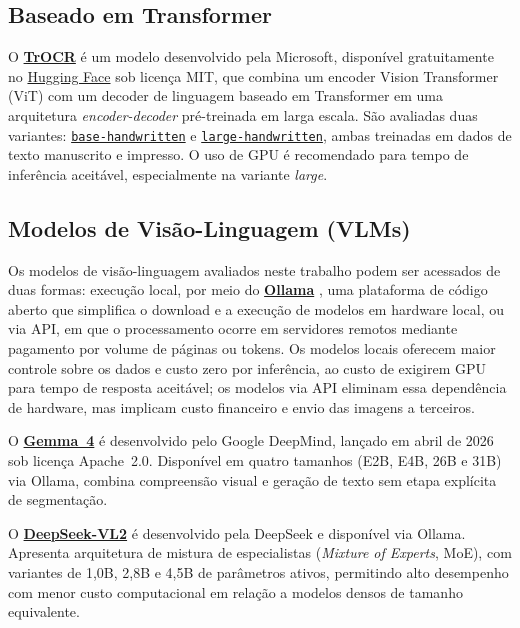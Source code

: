 \documentclass[
  12pt,
  oneside,
  a4paper,
  chapter=TITLE,
  section=TITLE,
  english,
  brazil
]{abntex2}
\begin{document}
\subsection{Baseado em Transformer}

O \href{https://huggingface.co/microsoft/trocr-base-handwritten}{\textbf{TrOCR}}
\cite{huang2021} é um modelo desenvolvido pela Microsoft, disponível gratuitamente no
\href{https://huggingface.co/microsoft/trocr-base-handwritten}{Hugging Face} sob licença
MIT, que combina um encoder Vision Transformer (ViT) com um decoder de linguagem baseado
em Transformer em uma arquitetura \textit{encoder-decoder} pré-treinada em larga escala.
São avaliadas duas variantes:
\href{https://huggingface.co/microsoft/trocr-base-handwritten}{\texttt{base-handwritten}}
e
\href{https://huggingface.co/microsoft/trocr-large-handwritten}{\texttt{large-handwritten}},
ambas treinadas em dados de texto manuscrito e impresso. O uso de GPU é recomendado para
tempo de inferência aceitável, especialmente na variante \textit{large}.

\subsection{Modelos de Visão-Linguagem (VLMs)}

Os modelos de visão-linguagem avaliados neste trabalho podem ser acessados de duas
formas: execução local, por meio do
\href{https://ollama.com}{\textbf{Ollama}} \cite{ollama2023}, uma plataforma de código
aberto que simplifica o download e a execução de modelos em hardware local, ou via
API, em que o processamento ocorre em servidores remotos mediante pagamento por volume
de páginas ou tokens. Os modelos locais oferecem maior controle sobre os dados e custo
zero por inferência, ao custo de exigirem GPU para tempo de resposta aceitável; os
modelos via API eliminam essa dependência de hardware, mas implicam custo financeiro e
envio das imagens a terceiros.

O \href{https://ai.google.dev/gemma/docs/core}{\textbf{Gemma~4}}
\cite{gemma4_modelcard} é desenvolvido pelo Google DeepMind, lançado em abril de 2026
sob licença Apache~2.0. Disponível em quatro tamanhos (E2B, E4B, 26B e 31B) via Ollama,
combina compreensão visual e geração de texto sem etapa explícita de segmentação.

O \href{https://github.com/deepseek-ai/DeepSeek-VL2}{\textbf{DeepSeek-VL2}}
\cite{wu2024deepseekvl2} é desenvolvido pela DeepSeek e disponível via Ollama. Apresenta
arquitetura de mistura de especialistas (\textit{Mixture of Experts}, MoE), com variantes
de 1,0B, 2,8B e 4,5B de parâmetros ativos, permitindo alto desempenho com menor custo
computacional em relação a modelos densos de tamanho equivalente.
\end{document}
